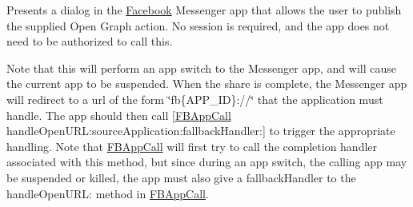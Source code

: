 Presents a dialog in the \hyperlink{interfaceFacebook}{Facebook} Messenger app that allows the user to publish the supplied Open Graph action. No session is required, and the app does not need to be authorized to call this.

Note that this will perform an app switch to the Messenger app, and will cause the current app to be suspended. When the share is complete, the Messenger app will redirect to a url of the form \char`\"{}fb\{\+A\+P\+P\+\_\+\+I\+D\}\+://\char`\"{} that the application must handle. The app should then call \mbox{[}\hyperlink{interfaceFBAppCall}{F\+B\+App\+Call} handle\+Open\+U\+R\+L\+:source\+Application\+:fallback\+Handler\+:\mbox{]} to trigger the appropriate handling. Note that \hyperlink{interfaceFBAppCall}{F\+B\+App\+Call} will first try to call the completion handler associated with this method, but since during an app switch, the calling app may be suspended or killed, the app must also give a fallback\+Handler to the handle\+Open\+U\+RL\+: method in \hyperlink{interfaceFBAppCall}{F\+B\+App\+Call}.


